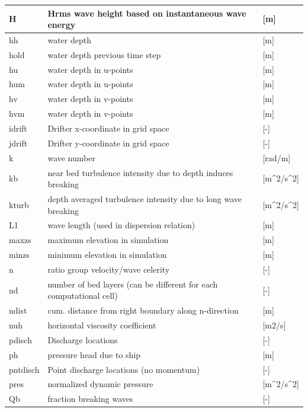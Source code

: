\documentclass{article}
\begin{document}
\begin{tabular}{|p{0.7in}|p{2.5in}|p{0.9in}|}
H & Hrms wave height based on instantaneous wave energy         & [m] \\ \hline 
hh & water depth               & [m] \\ \hline 
hold & water depth previous time step            & [m] \\ \hline 
hu & water depth in u-points             & [m] \\ \hline 
hum & water depth in u-points             & [m] \\ \hline 
hv & water depth in v-points             & [m] \\ \hline 
hvm & water depth in v-points             & [m] \\ \hline 
idrift & Drifter x-coordinate in grid space            & [-] \\ \hline 
jdrift & Drifter y-coordinate in grid space            & [-] \\ \hline 
k & wave number               & [rad/m] \\ \hline 
kb & near bed turbulence intensity due to depth induces breaking        & [m\^{}2/s\^{}2] \\ \hline 
kturb & depth averaged turbulence intensity due to long wave breaking        & [m\^{}2/s\^{}2] \\ \hline 
L1 & wave length (used in dispersion relation)           & [m] \\ \hline 
maxzs & maximum elevation in simulation             & [m] \\ \hline 
minzs & minimum elevation in simulation             & [m] \\ \hline 
n & ratio group velocity/wave celerity             & [-] \\ \hline 
nd & number of bed layers (can be different for each computational cell)      & [-] \\ \hline 
ndist & cum. distance from right boundary along n-direction          & [m] \\ \hline 
nuh & horizontal viscosity coefficient              & [m2/s] \\ \hline 
pdisch & Discharge locations               & [-] \\ \hline 
ph & pressure head due to ship            & [m] \\ \hline 
pntdisch & Point discharge locations (no momentum)            & [-] \\ \hline 
pres & normalized dynamic pressure              & [m\^{}2/s\^{}2] \\ \hline 
Qb & fraction breaking waves              & [-] \\ \hline 

\end{tabular}
\end{document}
